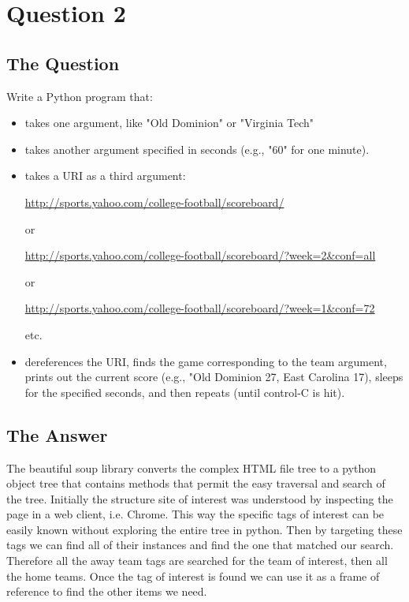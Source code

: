 \section{Question 2}

\subsection{The Question}

Write a Python program that:
\begin{itemize}
\item takes one argument, like "Old Dominion" or "Virginia Tech"
\item  takes another argument specified in seconds (e.g., "60" for 
     one minute).
 \item takes a URI as a third argument: 

     \url{http://sports.yahoo.com/college-football/scoreboard/}
    
    or

     \url{http://sports.yahoo.com/college-football/scoreboard/?week=2&conf=all}
    
 or

     \url{http://sports.yahoo.com/college-football/scoreboard/?week=1&conf=72}

     etc.
 \item dereferences the URI, finds the game corresponding to the team
     argument, prints out the current score (e.g., "Old Dominion 27, 
     East Carolina 17), sleeps for the specified seconds, and then
     repeats (until control-C is hit).
\end{itemize}


\subsection{The Answer}

The beautiful soup library converts the complex HTML file tree to a python object tree that contains methods that permit the easy traversal and search of the tree. Initially the structure site of interest was understood by inspecting the page in a web client, i.e. Chrome. This way the specific tags of interest can be easily known without exploring the entire tree in python. Then by targeting these tags we can find all of their instances and find the one that matched our search. Therefore all the away team tags are searched for the team of interest, then all the home teams. Once the tag of interest is found we can use it as a frame of reference to find the other items we need. 

